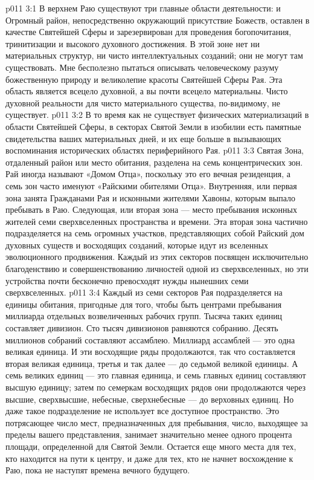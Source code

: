 \vs p011 3:1 В верхнем Раю существуют три главные области деятельности:   и  Огромный район, непосредственно окружающий присутствие Божеств, оставлен в качестве Святейшей Сферы и зарезервирован для проведения богопочитания, тринитизации и высокого духовного достижения. В этой зоне нет ни материальных структур, ни чисто интеллектуальных созданий; они не могут там существовать. Мне бесполезно пытаться описывать человеческому разуму божественную природу и великолепие красоты Святейшей Сферы Рая. Эта область является всецело духовной, а вы почти всецело материальны. Чисто духовной реальности для чисто материального существа, по\hyp{}видимому, не существует.
\vs p011 3:2 В то время как не существует физических материализаций в области Святейшей Сферы, в секторах Святой Земли в изобилии есть памятные свидетельства ваших материальных дней, и их еще больше в вызывающих воспоминания исторических областях периферийного Рая.
\vs p011 3:3 Святая Зона, отдаленный район или место обитания, разделена на семь концентрических зон. Рай иногда называют «Домом Отца», поскольку это его вечная резиденция, а семь зон часто именуют «Райскими обителями Отца». Внутренняя, или первая зона занята Гражданами Рая и исконными жителями Хавоны, которым выпало пребывать в Раю. Следующая, или вторая зона --- место пребывания исконных жителей семи сверхвселенных пространства и времени. Эта вторая зона частично подразделяется на семь огромных участков, представляющих собой Райский дом духовных существ и восходящих созданий, которые идут из вселенных эволюционного продвижения. Каждый из этих секторов посвящен исключительно благоденствию и совершенствованию личностей одной из сверхвселенных, но эти устройства почти бесконечно превосходят нужды нынешних семи сверхвселенных.
\vs p011 3:4 Каждый из семи секторов Рая подразделяется на единицы обитания, пригодные для того, чтобы быть центрами пребывания миллиарда отдельных возвеличенных рабочих групп. Тысяча таких единиц составляет дивизион. Сто тысяч дивизионов равняются собранию. Десять миллионов собраний составляют ассамблею. Миллиард ассамблей --- это одна великая единица. И эти восходящие ряды продолжаются, так что составляется вторая великая единица, третья и так далее --- до седьмой великой единицы. А семь великих единиц --- это главная единица, и семь главных единиц составляют высшую единицу; затем по семеркам восходящих рядов они продолжаются через высшие, сверхвысшие, небесные, сверхнебесные --- до верховных единиц. Но даже такое подразделение не использует все доступное пространство. Это потрясающее число мест, предназначенных для пребывания, число, выходящее за пределы вашего представления, занимает значительно менее одного процента площади, определенной для Святой Земли. Остается еще много места для тех, кто находится на пути к центру, и даже для тех, кто не начнет восхождение к Раю, пока не наступят времена вечного будущего.
